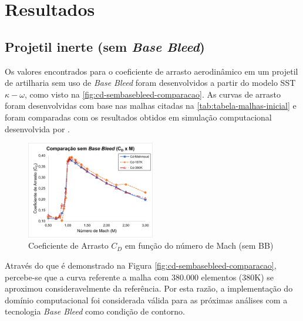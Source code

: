 \chapter{Resultados}\label{cap:resultados}
\graphicspath{{chapter-07/img-cap07/}}

\section{Projetil inerte (sem \textit{Base Bleed})}\label{sec:resultados-sem-basebleed}

Os valores encontrados para o coeficiente de arrasto aerodinâmico em um projetil de artilharia sem uso de \textit{Base Bleed} foram desenvolvidos a partir do modelo SST $\kappa-\omega$, como visto na \autoref{fig:cd-sembasebleed-comparacao}. As curvas de arrasto foram desenvolvidas com base nas malhas citadas na \autoref{tab:tabela-malhas-inicial} e foram comparadas com os resultados obtidos em simulação computacional desenvolvida por \citeauthor{Mahmoud2009}. 

\begin{figure}[!ht]
	\centering
	\includegraphics[width=0.5\textwidth]{cd-sembasebleed-comparacao.png}
	\caption{Coeficiente de Arrasto $C_{D}$ em função do número de Mach (sem BB)}
	\label{fig:cd-sembasebleed-comparacao}
\end{figure}

Através do que é demonstrado na Figura \autoref{fig:cd-sembasebleed-comparacao}, percebe-se que a curva referente a malha com 380.000 elementos (380K) se aproximou consideravelmente da referência. Por esta razão, a implementação do domínio computacional foi considerada válida para as próximas análises com a tecnologia \textit{Base Bleed} como condição de contorno.

